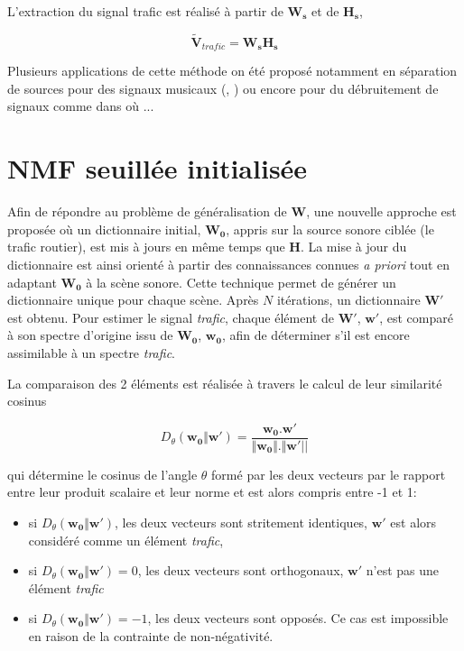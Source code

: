 L'extraction du signal trafic est réalisé à partir de $\mathbf{W_s}$ et de $\mathbf{H_s}$, 

\begin{equation}
\mathbf{\tilde{V}}_{trafic} = \mathbf{W_s H_s}
\end{equation}

Plusieurs applications de cette méthode on été proposé notamment en séparation de sources pour des signaux musicaux (\cite{smaragdis_supervised_2007}, \cite{duan_online_2012}) ou encore pour du débruitement de signaux comme dans \cite{mysore_non-negative_2011} où ... 

\section{NMF seuillée initialisée}\label{sec:NMF_TI}

Afin de répondre au problème de généralisation de $\mathbf{W}$, une nouvelle approche est proposée où un dictionnaire initial, $\mathbf{W_0}$, appris sur la source sonore ciblée (le trafic routier), est mis à jours en même temps que $\mathbf{H}$. La mise à jour du dictionnaire est ainsi orienté à partir des connaissances connues \textit{a priori} tout en adaptant $\mathbf{W_0}$ à la scène sonore. Cette technique permet de générer un dictionnaire unique pour chaque scène. Après $N$ itérations, un dictionnaire $\mathbf{W'}$ est obtenu. Pour estimer le signal \textit{trafic}, chaque élément de $\mathbf{W'}$, $\mathbf{w'}$, est comparé à son spectre d'origine issu de $\mathbf{W_0}$, $\mathbf{w_0}$, afin de déterminer s'il est encore assimilable à un spectre \textit{trafic}.

La comparaison des 2 éléments est réalisée à travers le calcul de leur similarité cosinus

\begin{equation}
 D_{\theta}(\mathbf{w_0}\Vert\mathbf{w'}) = \frac{\mathbf{w_0}.\mathbf{w'}}{\Vert\mathbf{w_0}  \Vert. \Vert\mathbf{w'} \vert \vert}
\end{equation}

 qui détermine le cosinus de l'angle $\theta$ formé par les deux vecteurs par le rapport entre leur produit scalaire et leur norme et est alors compris entre -1 et 1: 

\begin{itemize}
\item si $D_{\theta}(\mathbf{w_0}\Vert\mathbf{w'})$, les deux vecteurs sont stritement identiques, $\mathbf{w'}$ est alors considéré comme un élément \textit{trafic}, 
\item si $D_{\theta}(\mathbf{w_0}\Vert\mathbf{w'}) = 0$, les deux vecteurs sont orthogonaux, $\mathbf{w'}$ n'est pas une élément \textit{trafic}
\item si $D_{\theta}(\mathbf{w_0}\Vert\mathbf{w'}) = -1$, les deux vecteurs sont opposés. Ce cas est impossible en raison de la contrainte de non-négativité.\\
\end{itemize}

